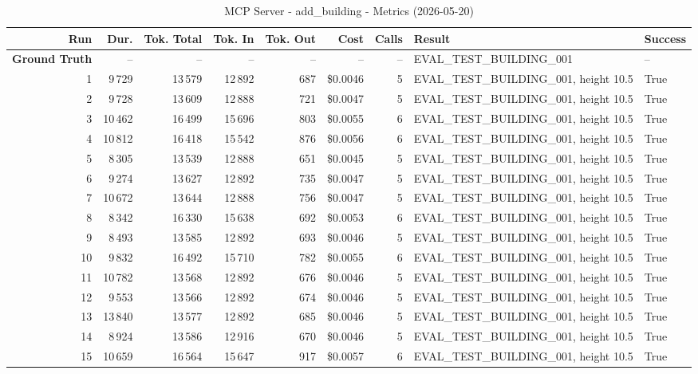 \documentclass[a4paper,11pt]{article}
\begin{document}
\begin{table}[ht]
\centering
\scriptsize
\caption{MCP Server - add\_building - Metrics (2026-05-20)}
\label{tab:mcp\_add\_building\_metrics\_2026-05-20}
\begin{tabular}{r r r r r r r p{3cm} l}
\hline
Run & Dur. & Tok. Total & Tok. In & Tok. Out & Cost & Calls & Result & Success \\
\hline
\textbf{Ground Truth} & -- & -- & -- & -- & -- & -- & EVAL\_TEST\_BUILDING\_001 & -- \\
\hline
1 & 9\,729 & 13\,579 & 12\,892 & 687 & \$0.0046 & 5 & EVAL\_TEST\_BUILDING\_001, height 10.5 & True \\
2 & 9\,728 & 13\,609 & 12\,888 & 721 & \$0.0047 & 5 & EVAL\_TEST\_BUILDING\_001, height 10.5 & True \\
3 & 10\,462 & 16\,499 & 15\,696 & 803 & \$0.0055 & 6 & EVAL\_TEST\_BUILDING\_001, height 10.5 & True \\
4 & 10\,812 & 16\,418 & 15\,542 & 876 & \$0.0056 & 6 & EVAL\_TEST\_BUILDING\_001, height 10.5 & True \\
5 & 8\,305 & 13\,539 & 12\,888 & 651 & \$0.0045 & 5 & EVAL\_TEST\_BUILDING\_001, height 10.5 & True \\
6 & 9\,274 & 13\,627 & 12\,892 & 735 & \$0.0047 & 5 & EVAL\_TEST\_BUILDING\_001, height 10.5 & True \\
7 & 10\,672 & 13\,644 & 12\,888 & 756 & \$0.0047 & 5 & EVAL\_TEST\_BUILDING\_001, height 10.5 & True \\
8 & 8\,342 & 16\,330 & 15\,638 & 692 & \$0.0053 & 6 & EVAL\_TEST\_BUILDING\_001, height 10.5 & True \\
9 & 8\,493 & 13\,585 & 12\,892 & 693 & \$0.0046 & 5 & EVAL\_TEST\_BUILDING\_001, height 10.5 & True \\
10 & 9\,832 & 16\,492 & 15\,710 & 782 & \$0.0055 & 6 & EVAL\_TEST\_BUILDING\_001, height 10.5 & True \\
11 & 10\,782 & 13\,568 & 12\,892 & 676 & \$0.0046 & 5 & EVAL\_TEST\_BUILDING\_001, height 10.5 & True \\
12 & 9\,553 & 13\,566 & 12\,892 & 674 & \$0.0046 & 5 & EVAL\_TEST\_BUILDING\_001, height 10.5 & True \\
13 & 13\,840 & 13\,577 & 12\,892 & 685 & \$0.0046 & 5 & EVAL\_TEST\_BUILDING\_001, height 10.5 & True \\
14 & 8\,924 & 13\,586 & 12\,916 & 670 & \$0.0046 & 5 & EVAL\_TEST\_BUILDING\_001, height 10.5 & True \\
15 & 10\,659 & 16\,564 & 15\,647 & 917 & \$0.0057 & 6 & EVAL\_TEST\_BUILDING\_001, height 10.5 & True \\

\end{tabular}
\end{table}
\end{document}

